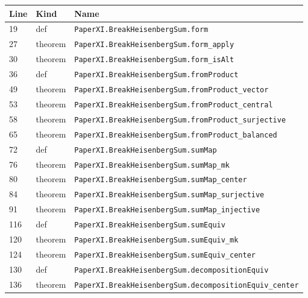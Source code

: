 \documentclass[10pt,oneside]{book}
\begin{document}
\begin{longtable}{@{}p{}p{}p{}@{}}\toprule Line&Kind&Name\\\midrule\endhead

19&def&\nolinkurl{PaperXI.BreakHeisenbergSum.form}\\

27&theorem&\nolinkurl{PaperXI.BreakHeisenbergSum.form_apply}\\

30&theorem&\nolinkurl{PaperXI.BreakHeisenbergSum.form_isAlt}\\

36&def&\nolinkurl{PaperXI.BreakHeisenbergSum.fromProduct}\\

49&theorem&\nolinkurl{PaperXI.BreakHeisenbergSum.fromProduct_vector}\\

53&theorem&\nolinkurl{PaperXI.BreakHeisenbergSum.fromProduct_central}\\

58&theorem&\nolinkurl{PaperXI.BreakHeisenbergSum.fromProduct_surjective}\\

65&theorem&\nolinkurl{PaperXI.BreakHeisenbergSum.fromProduct_balanced}\\

72&def&\nolinkurl{PaperXI.BreakHeisenbergSum.sumMap}\\

76&theorem&\nolinkurl{PaperXI.BreakHeisenbergSum.sumMap_mk}\\

80&theorem&\nolinkurl{PaperXI.BreakHeisenbergSum.sumMap_center}\\

84&theorem&\nolinkurl{PaperXI.BreakHeisenbergSum.sumMap_surjective}\\

91&theorem&\nolinkurl{PaperXI.BreakHeisenbergSum.sumMap_injective}\\

116&def&\nolinkurl{PaperXI.BreakHeisenbergSum.sumEquiv}\\

120&theorem&\nolinkurl{PaperXI.BreakHeisenbergSum.sumEquiv_mk}\\

124&theorem&\nolinkurl{PaperXI.BreakHeisenbergSum.sumEquiv_center}\\

130&def&\nolinkurl{PaperXI.BreakHeisenbergSum.decompositionEquiv}\\

136&theorem&\nolinkurl{PaperXI.BreakHeisenbergSum.decompositionEquiv_center}\\

\bottomrule\end{longtable}
\end{document}
